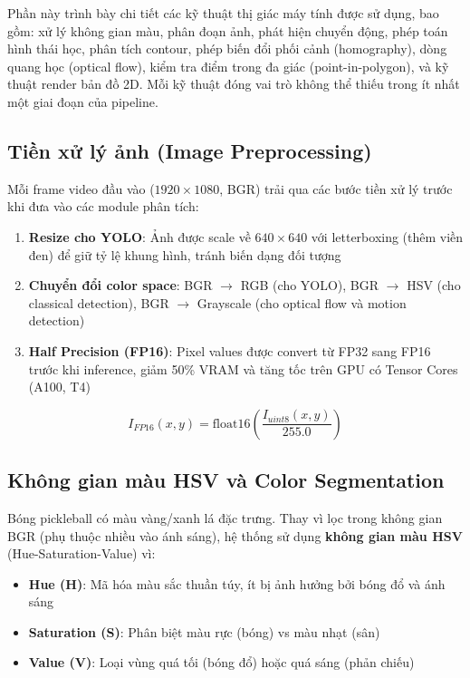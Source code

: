 \documentclass[12pt,a4paper]{article}
\begin{document}
Phần này trình bày chi tiết các kỹ thuật thị giác máy tính được sử dụng, bao gồm: xử lý không gian màu, phân đoạn ảnh, phát hiện chuyển động, phép toán hình thái học, phân tích contour, phép biến đổi phối cảnh (homography), dòng quang học (optical flow), kiểm tra điểm trong đa giác (point-in-polygon), và kỹ thuật render bản đồ 2D. Mỗi kỹ thuật đóng vai trò không thể thiếu trong ít nhất một giai đoạn của pipeline.

\subsection{Tiền xử lý ảnh (Image Preprocessing)}

Mỗi frame video đầu vào ($1920 \times 1080$, BGR) trải qua các bước tiền xử lý trước khi đưa vào các module phân tích:

\begin{enumerate}[noitemsep]
    \item \textbf{Resize cho YOLO}: Ảnh được scale về $640 \times 640$ với letterboxing (thêm viền đen) để giữ tỷ lệ khung hình, tránh biến dạng đối tượng
    \item \textbf{Chuyển đổi color space}: BGR $\to$ RGB (cho YOLO), BGR $\to$ HSV (cho classical detection), BGR $\to$ Grayscale (cho optical flow và motion detection)
    \item \textbf{Half Precision (FP16)}: Pixel values được convert từ FP32 sang FP16 trước khi inference, giảm 50\% VRAM và tăng tốc trên GPU có Tensor Cores (A100, T4)
\end{enumerate}

\begin{equation}
I_{FP16}(x,y) = \text{float16}\left(\frac{I_{uint8}(x,y)}{255.0}\right)
\end{equation}

\subsection{Không gian màu HSV và Color Segmentation}
\label{sec:hsv}

Bóng pickleball có màu vàng/xanh lá đặc trưng. Thay vì lọc trong không gian BGR (phụ thuộc nhiều vào ánh sáng), hệ thống sử dụng \textbf{không gian màu HSV} (Hue-Saturation-Value) vì:

\begin{itemize}[noitemsep]
    \item \textbf{Hue (H)}: Mã hóa màu sắc thuần túy, ít bị ảnh hưởng bởi bóng đổ và ánh sáng
    \item \textbf{Saturation (S)}: Phân biệt màu rực (bóng) vs màu nhạt (sân)
    \item \textbf{Value (V)}: Loại vùng quá tối (bóng đổ) hoặc quá sáng (phản chiếu)
\end{itemize}
\end{document}
